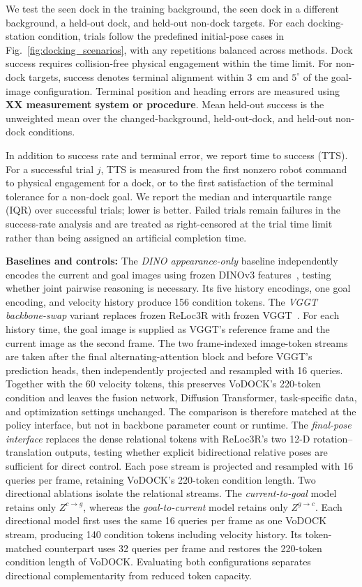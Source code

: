 \documentclass[letterpaper, 10 pt, conference]{IEEEtran}  %
\begin{document}
We test the seen dock in the training background, the seen dock in a different background, a held-out dock, and held-out non-dock targets. For each docking-station condition, trials follow the predefined initial-pose cases in Fig.~\ref{fig:docking_scenarios}, with any repetitions balanced across methods. Dock success requires collision-free physical engagement within the time limit. For non-dock targets, success denotes terminal alignment within 3~cm and $5^\circ$ of the goal-image configuration. Terminal position and heading errors are measured using \textbf{XX measurement system or procedure}. Mean held-out success is the unweighted mean over the changed-background, held-out-dock, and held-out non-dock conditions.

In addition to success rate and terminal error, we report time to success (TTS). For a successful trial $j$, TTS is measured from the first nonzero robot command to physical engagement for a dock, or to the first satisfaction of the terminal tolerance for a non-dock goal. We report the median and interquartile range (IQR) over successful trials; lower is better. Failed trials remain failures in the success-rate analysis and are treated as right-censored at the trial time limit rather than being assigned an artificial completion time.

\textbf{Baselines and controls:}
The \emph{DINO appearance-only} baseline independently encodes the current and goal images using frozen DINOv3 features~\cite{dino2025}, testing whether joint pairwise reasoning is necessary. Its five history encodings, one goal encoding, and velocity history produce 156 condition tokens. The \emph{VGGT backbone-swap} variant replaces frozen ReLoc3R with frozen VGGT~\cite{vggt2025}. For each history time, the goal image is supplied as VGGT's reference frame and the current image as the second frame. The two frame-indexed image-token streams are taken after the final alternating-attention block and before VGGT's prediction heads, then independently projected and resampled with 16 queries. Together with the 60 velocity tokens, this preserves VoDOCK's 220-token condition and leaves the fusion network, Diffusion Transformer, task-specific data, and optimization settings unchanged. The comparison is therefore matched at the policy interface, but not in backbone parameter count or runtime. The \emph{final-pose interface} replaces the dense relational tokens with ReLoc3R's two 12-D rotation--translation outputs, testing whether explicit bidirectional relative poses are sufficient for direct control. Each pose stream is projected and resampled with 16 queries per frame, retaining VoDOCK's 220-token condition length. Two directional ablations isolate the relational streams. The \emph{current-to-goal} model retains only $Z^{c\rightarrow g}$, whereas the \emph{goal-to-current} model retains only $Z^{g\rightarrow c}$. Each directional model first uses the same 16 queries per frame as one VoDOCK stream, producing 140 condition tokens including velocity history. Its token-matched counterpart uses 32 queries per frame and restores the 220-token condition length of VoDOCK. Evaluating both configurations separates directional complementarity from reduced token capacity.
\end{document}
